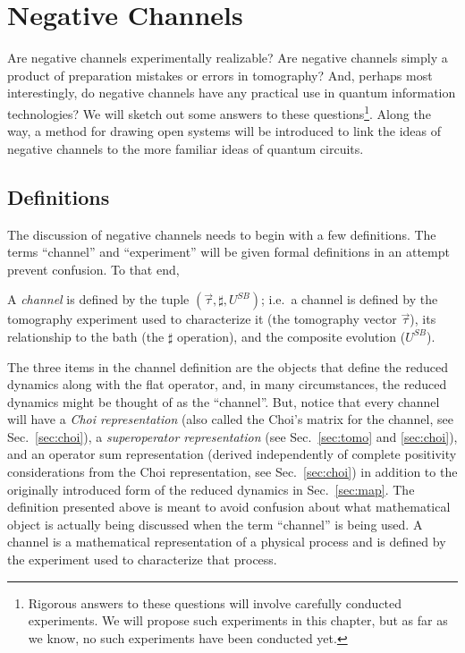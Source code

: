 \chapter{Negative Channels}

Are negative channels experimentally realizable?  Are negative channels simply a product of preparation mistakes or errors in tomography?  And, perhaps most interestingly, do negative channels have any practical use in quantum information technologies?  We will sketch out some answers to these questions\footnote{Rigorous answers to these questions will involve carefully conducted experiments.  We will propose such experiments in this chapter, but as far as we know, no such experiments have been conducted yet.}.  Along the way, a method for drawing open systems will be introduced to link the ideas of negative channels to the more familiar ideas of quantum circuits.  

\section{Definitions}

The discussion of negative channels needs to begin with a few definitions.  The terms ``channel'' and ``experiment'' will be given formal definitions in an attempt prevent confusion.  To that end,
\begin{definition}
A {\em channel} is defined by the tuple $(\vec{\tau},\sharp,U^{SB})$; i.e.\ a channel is defined by the tomography experiment used to characterize it (the tomography vector $\vec{\tau}$), its relationship to the bath (the $\sharp$ operation), and the composite evolution ($U^{SB}$).  
\end{definition}
The three items in the channel definition are the objects that define the reduced dynamics along with the flat operator, and, in many circumstances, the reduced dynamics might be thought of as the ``channel''.  But, notice that every channel will have a {\em Choi representation} (also called the Choi's matrix for the channel, see Sec.\ \ref{sec:choi}), a {\em superoperator representation} (see Sec.\ \ref{sec:tomo} and \ref{sec:choi}), and an operator sum representation (derived independently of complete positivity considerations from the Choi representation, see Sec.\ \ref{sec:choi}) in addition to the originally introduced form of the reduced dynamics in Sec.\ \ref{sec:map}.  The definition presented above is meant to avoid confusion about what mathematical object is actually being discussed when the term ``channel'' is being used.  A channel is a mathematical representation of a physical process and is defined by the experiment used to characterize that process.

